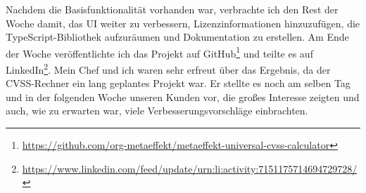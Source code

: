 Nachdem die Basisfunktionalität vorhanden war, verbrachte ich den Rest der Woche damit, das UI weiter zu verbessern, Lizenzinformationen hinzuzufügen, die TypeScript-Bibliothek aufzuräumen und Dokumentation zu erstellen.
Am Ende der Woche veröffentlichte ich das Projekt auf GitHub\footnote{\url{https://github.com/org-metaeffekt/metaeffekt-universal-cvss-calculator}} und teilte es auf LinkedIn\footnote{\url{https://www.linkedin.com/feed/update/urn:li:activity:7151175714694729728/}}.
Mein Chef und ich waren sehr erfreut über das Ergebnis, da der CVSS-Rechner ein lang geplantes Projekt war.
Er stellte es noch am selben Tag und in der folgenden Woche unseren Kunden vor, die großes Interesse zeigten und auch, wie zu erwarten war, viele Verbesserungsvorschläge einbrachten.
